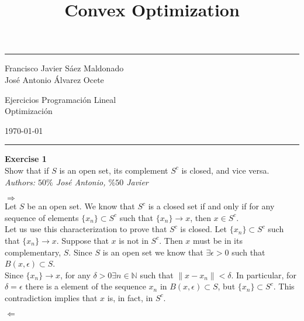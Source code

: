 \documentclass[11pt,table]{article}
\title{Convex Optimization}
\newenvironment{problem}[2][Exercise]
{ \begin{mdframed}[backgroundcolor=gray!20] \textbf{#1 #2} \\}
	{\hspace{0.0cm}\newline\newline \emph{Authors: \(50\%\) José Antonio, \(\%50\) Javier}  \end{mdframed}}
\begin{document}

\fancyhead[C]{}
\hrule \medskip %
\begin{minipage}{0.295\textwidth}
	\raggedright
	\footnotesize
	Francisco Javier Sáez Maldonado \hfill\\
	José Antonio Álvarez Ocete \hfill\\
\end{minipage}
\begin{minipage}{0.4\textwidth}
	\centering
	\large
	Ejercicios Programación Lineal\\
	\normalsize
	Optimización\\
\end{minipage}
\begin{minipage}{0.295\textwidth}
	\raggedleft
	\today\hfill\\
\end{minipage}
\medskip\hrule
\bigskip


\begin{problem}{1}
Show that if \( S \) is an open set, its complement \( S^c \) is closed, and vice versa.
\end{problem}

\(\boxed{\Rightarrow}\)\\

Let \(S\) be an open set. We know that \(S^c\) is a closed set if and only if for any sequence of elements \(\{x_n\} \subset S^c\) such that \(\{x_n\} \longrightarrow x\), then \(x \in S^c\). \\

Let us use this characterization to prove that \(S^c\) is closed. Let \(\{x_n\} \subset S^c\) such that \(\{x_n\} \longrightarrow x\). Suppose that \(x\) is not in \(S^c\). Then \(x\) must be in its complementary, \(S\). Since \(S\) is an open set we know that \(\exists \epsilon > 0\) such that \( B(x, \epsilon) \subset S\). \\

Since \(\{x_n\} \longrightarrow x\), for any \(\delta > 0 \exists n \in \mathbb{N}\) such that \( \parallel x - x_n \parallel < \delta\). In particular, for \(\delta = \epsilon\) there is a element of the sequence \(x_n\) in \( B(x, \epsilon) \subset S\), but \(\{x_n\} \subset S^c\). This contradiction implies that \(x\) is, in fact, in \(S^c\).

\(\boxed{\Leftarrow}\)\\
\end{document}
